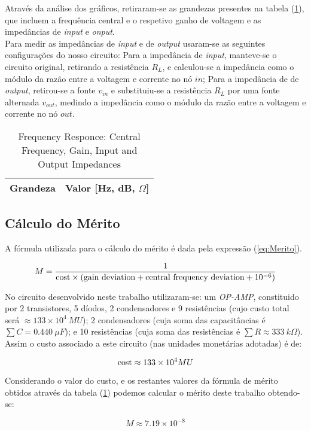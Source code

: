 Através da análise dos gráficos, retiraram-se as grandezas presentes na tabela (\ref{tab:SimValues}), que
incluem a frequência central e o respetivo ganho de voltagem e as impedâncias de \emph{input} e \emph{onput}.
\\
Para medir as impedâncias de \emph{input} e de \emph{output} usaram-se as seguintes configurações do nosso circuito:
Para a impedância de \emph{input}, manteve-se o circuito original, retirando a resistência $R_L$, e calculou-se
a impedância como o módulo da razão entre a voltagem e corrente no nó $in$; Para a impedância de de \emph{output},
retirou-se a fonte $v_{in}$ e substituiu-se a resistência $R_L$ por uma fonte alternada $v_{out}$, medindo a impedância
como o módulo da razão entre a voltagem e corrente no nó $out$.

\begin{table}[H]
    \centering
    \begin{tabular}{|l|r|}
    \hline    
    {\bf Grandeza} & {\bf Valor [Hz, dB, $\Omega$]} \\ \hline
    
    
    
    \end{tabular}
    \caption{Frequency Responce: Central Frequency, Gain, Input and Output Impedances}
    \label{tab:SimValues}
\end{table}


\subsection{Cálculo do Mérito}

A fórmula utilizada para o cálculo do mérito é dada pela expressão (\ref{eq:Merito}).

\begin{equation}
    M = \frac{1}{\textnormal{cost} \times (\textnormal{gain deviation} + \textnormal{central frequency deviation} + 10^{- 6})}
    \label{eq:Merito}
\end{equation}

No circuito desenvolvido neste trabalho utilizaram-se: um \emph{OP-AMP}, constituido por 2 transistores, 5 díodos, 2 condensadores e
9 resistências (cujo custo total será $\approx 133 \times 10^{4} \: MU$); 2 condensadores (cuja soma das capacitâncias é $\sum C = 0.440 \: \mu F$);
e 10 resistências (cuja soma das resistências é $\sum R \approx 333 \: k\Omega$).
\\
Assim o custo associado a este circuito (nas unidades monetárias adotadas) é de:

\begin{equation}
  \label{eq:Custo}
  \textnormal{cost} \approx 133 \times 10^{4} MU
\end{equation}

Considerando o valor do custo, e os restantes valores da fórmula de mérito obtidos através da tabela (\ref{tab:SimValues})
podemos calcular o mérito deste trabalho obtendo-se:

\begin{equation}
  \label{eq:ValorMerito}
  M \approx 7.19 \times 10^{- 8}
\end{equation}